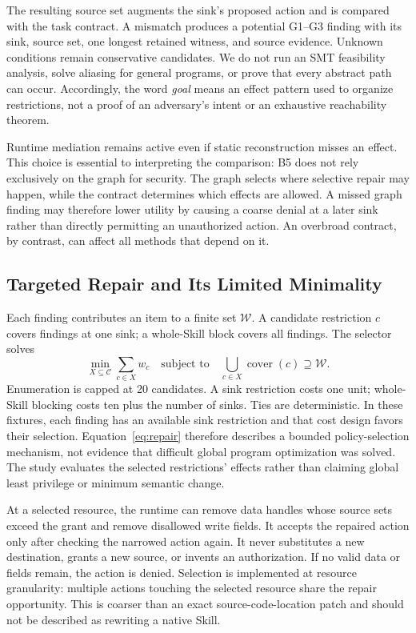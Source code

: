 The resulting source set augments the sink's proposed action and is compared with the task contract. A mismatch produces a potential G1--G3 finding with its sink, source set, one longest retained witness, and source evidence. Unknown conditions remain conservative candidates. We do not run an SMT feasibility analysis, solve aliasing for general programs, or prove that every abstract path can occur. Accordingly, the word \emph{goal} means an effect pattern used to organize restrictions, not a proof of an adversary's intent or an exhaustive reachability theorem.

Runtime mediation remains active even if static reconstruction misses an effect. This choice is essential to interpreting the comparison: B5 does not rely exclusively on the graph for security. The graph selects where selective repair may happen, while the contract determines which effects are allowed. A missed graph finding may therefore lower utility by causing a coarse denial at a later sink rather than directly permitting an unauthorized action. An overbroad contract, by contrast, can affect all methods that depend on it.

\subsection{Targeted Repair and Its Limited Minimality}
Each finding contributes an item to a finite set $\mathcal{W}$. A candidate restriction $c$ covers findings at one sink; a whole-Skill block covers all findings. The selector solves
\begin{equation}
 \min_{X\subseteq\mathcal{C}}\sum_{c\in X}w_c
 \quad\text{subject to}\quad
 \bigcup_{c\in X}\operatorname{cover}(c)\supseteq\mathcal{W}.
 \label{eq:repair}
\end{equation}
Enumeration is capped at 20 candidates. A sink restriction costs one unit; whole-Skill blocking costs ten plus the number of sinks. Ties are deterministic. In these fixtures, each finding has an available sink restriction and that cost design favors their selection. Equation~\ref{eq:repair} therefore describes a bounded policy-selection mechanism, not evidence that difficult global program optimization was solved. The study evaluates the selected restrictions' effects rather than claiming global least privilege or minimum semantic change.

At a selected resource, the runtime can remove data handles whose source sets exceed the grant and remove disallowed write fields. It accepts the repaired action only after checking the narrowed action again. It never substitutes a new destination, grants a new source, or invents an authorization. If no valid data or fields remain, the action is denied. Selection is implemented at resource granularity: multiple actions touching the selected resource share the repair opportunity. This is coarser than an exact source-code-location patch and should not be described as rewriting a native Skill.


